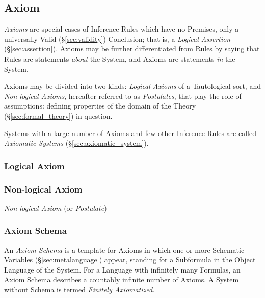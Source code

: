 \subsection{Axiom}\label{sec:axiom}

\emph{Axioms} are special cases of Inference Rules which have no
Premises, only a universally Valid (\S\ref{sec:validity}) Conclusion;
that is, a \emph{Logical Assertion} (\S\ref{sec:assertion}). Axioms
may be further differentiated from Rules by saying that Rules are
statements \emph{about} the System, and Axioms are statements
\emph{in} the System.

Axioms may be divided into two kinds: \emph{Logical Axioms} of a
Tautological sort, and \emph{Non-logical Axioms}, hereafter referred
to as \emph{Postulates}, that play the role of assumptions: defining
properties of the domain of the Theory (\S\ref{sec:formal_theory}) in
question.

Systems with a large number of Axioms and few other Inference Rules
are called \emph{Axiomatic Systems} (\S\ref{sec:axiomatic_system}).



\subsubsection{Logical Axiom}\label{sec:logical_axiom}

\subsubsection{Non-logical Axiom}\label{sec:nonlogical_axiom}

\emph{Non-logical Axiom} (or \emph{Postulate})



\subsubsection{Axiom Schema}\label{sec:axiom_schema}

An \emph{Axiom Schema} is a template for Axioms in which one or more
Schematic Variables (\S\ref{sec:metalanguage}) appear, standing for a
Subformula in the Object Language of the System. For a Language with
infinitely many Formulas, an Axiom Schema describes a countably infinite
number of Axioms. A System without Schema is termed \emph{Finitely
  Axiomatized}.



